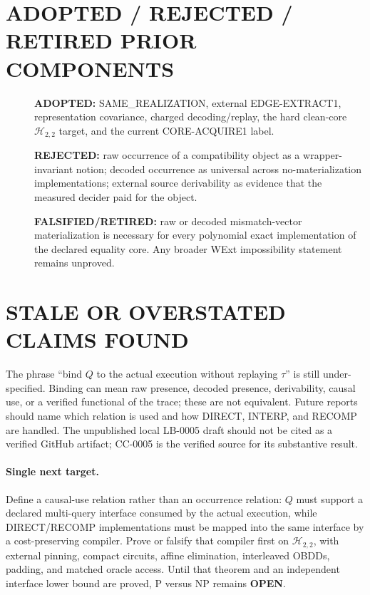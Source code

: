 \documentclass[11pt]{article}
\begin{document}
\section{ADOPTED / REJECTED / RETIRED PRIOR COMPONENTS}
\begin{description}
\item[] \textbf{ADOPTED:} SAME\_REALIZATION, external EDGE-EXTRACT1,
representation covariance, charged decoding/replay, the hard clean-core
$\mathcal H_{2,2}$ target, and the current CORE-ACQUIRE1 label.
\item[] \textbf{REJECTED:} raw occurrence of a compatibility object as a
wrapper-invariant notion; decoded occurrence as universal across
no-materialization implementations; external source derivability as evidence
that the measured decider paid for the object.
\item[] \textbf{FALSIFIED/RETIRED:} raw or decoded mismatch-vector
materialization is necessary for every polynomial exact implementation of the
declared equality core.  Any broader WExt impossibility statement remains
unproved.
\end{description}

\section{STALE OR OVERSTATED CLAIMS FOUND}
The phrase ``bind $Q$ to the actual execution without replaying $\tau$'' is
still under-specified.  Binding can mean raw presence, decoded presence,
derivability, causal use, or a verified functional of the trace; these are not
equivalent.  Future reports should name which relation is used and how DIRECT,
INTERP, and RECOMP are handled.  The unpublished local LB-0005 draft should
not be cited as a verified GitHub artifact; CC-0005 is the verified source for
its substantive result.

\paragraph{Single next target.}
Define a causal-use relation rather than an occurrence relation: $Q$ must
support a declared multi-query interface consumed by the actual execution,
while DIRECT/RECOMP implementations must be mapped into the same interface by
a cost-preserving compiler.  Prove or falsify that compiler first on
$\mathcal H_{2,2}$, with external pinning, compact circuits, affine
elimination, interleaved OBDDs, padding, and matched oracle access.  Until
that theorem and an independent interface lower bound are proved, P versus NP
remains \textbf{OPEN}.
\end{document}
